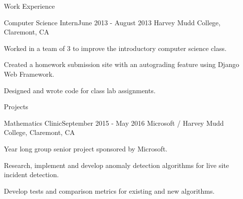 \documentclass{resume} %
\begin{document}
\begin{rSection}{Work Experience}

\vspace{-2mm}



\begin{rSubsection}{Computer Science Intern}{June 2013 - August 2013}{ }{Harvey Mudd College, Claremont, CA}
\item Worked in a team of 3 to improve the introductory
 computer science class.
\item	Created a homework submission site with an autograding feature using Django Web Framework. 
\item Designed and wrote code for class lab assignments. 


\end{rSubsection}

%
%
%
%

\end{rSection}



\vspace{-2mm}

\begin{rSection}{Projects}


\begin{rSubsection}{Mathematics Clinic}{September 2015 - May 2016}{ }{Microsoft / Harvey Mudd College, Claremont, CA}
\item Year long group senior project sponsored by Microsoft. 
\item Research, implement and develop anomaly detection algorithms for live site incident detection.
\item Develop tests and comparison metrics for existing and new algorithms. 

\end{rSubsection}


\end{rSection}
\end{document}
